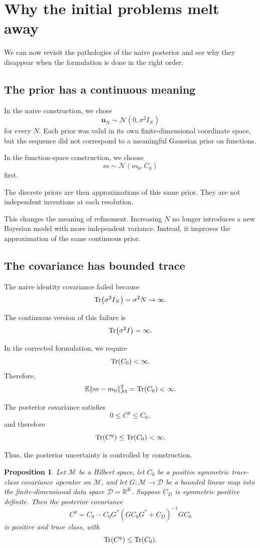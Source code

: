\documentclass[11pt,a4paper]{book}
\newtheorem{proposition}[definition]{Proposition}
\newcommand{\M}{\mathcal{M}}      %
\newcommand{\D}{\mathcal{D}}      %
\newcommand{\R}{\mathbb{R}}
\newcommand{\G}{G}
\newcommand{\Gadj}{G^\ast}
\begin{document}
\section{Why the initial problems melt away}

We can now revisit the pathologies of the naive posterior and see why they
disappear when the formulation is done in the right order.

\subsection{The prior has a continuous meaning}

In the naive construction, we chose
\[
    \bm{u}_N\sim\mathcal{N}(0,\sigma^2 I_N)
\]
for every $N$. Each prior was valid in its own finite-dimensional coordinate
space, but the sequence did not correspond to a meaningful Gaussian prior on
functions.

In the function-space construction, we choose
\[
    m\sim\mathcal{N}(m_0,C_0)
\]
first.

The discrete priors are then approximations of this same prior. They are not
independent inventions at each resolution.

This changes the meaning of refinement. Increasing $N$ no longer introduces a
new Bayesian model with more independent variance. Instead, it improves the
approximation of the same continuous prior.

\subsection{The covariance has bounded trace}

The naive identity covariance failed because
\[
    \Tr(\sigma^2 I_N)
    =
    \sigma^2 N
    \to\infty.
\]

The continuous version of this failure is
\[
    \Tr(\sigma^2 I)
    =
    \infty.
\]

In the corrected formulation, we require
\[
    \Tr(C_0)<\infty.
\]
Therefore,
\[
    \mathbb{E}\|m-m_0\|_{\M}^2
    =
    \Tr(C_0)
    <
    \infty.
\]

The posterior covariance satisfies
\[
    0\leq C^y\leq C_0,
\]
and therefore
\[
    \Tr(C^y)\leq \Tr(C_0)<\infty.
\]

Thus, the posterior uncertainty is controlled by construction.

\begin{proposition}
Let $\M$ be a Hilbert space, let $C_0$ be a positive symmetric trace-class
covariance operator on $\M$, and let $\G:\M\to\D$ be a bounded linear map into
the finite-dimensional data space $\D=\R^K$. Suppose $C_D$ is symmetric positive
definite. Then the posterior covariance
\[
    C^y
    =
    C_0
    -
    C_0\Gadj
    \left(
        \G C_0\Gadj + C_D
    \right)^{-1}
    \G C_0
\]
is positive and trace class, with
\[
    \Tr(C^y)\leq\Tr(C_0).
\]
\end{proposition}
\end{document}
